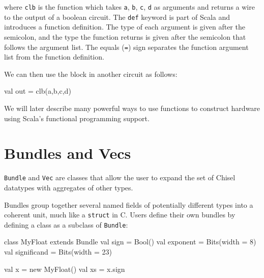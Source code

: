 \documentclass[twocolumn,10pt]{article}
\def\code#1{{\tt #1}}
\begin{document}
\noindent
where \code{clb} is the function which takes \code{a}, \code{b},
\code{c}, \code{d} as arguments and returns a wire to the output of a
boolean circuit.  The \code{def} keyword is part of Scala and
introduces a function definition.  The type of each argument is given
after the semicolon, and the type the function returns is given after
the semicolon that follows the argument list.  The equals (\code{=})
sign separates the function argument list from the function
definition.

We can then use the block in another circuit as follows:
\begin{scala}
val out = clb(a,b,c,d)
\end{scala}






We will later describe many powerful ways to use functions to
construct hardware using Scala's functional programming support.

\section{Bundles and Vecs}

\code{Bundle} and \code{Vec} are classes that allow the user to expand
the set of Chisel datatypes with aggregates of other types.

Bundles group together several named fields of potentially different
types into a coherent unit, much like a \code{struct} in C. Users
define their own bundles by defining a class as a subclass of
\code{Bundle}:
\begin{scala}
class MyFloat extends Bundle {
  val sign        = Bool()
  val exponent    = Bits(width = 8)
  val significand = Bits(width = 23)
}

val x  = new MyFloat()
val xs = x.sign
\end{scala}
\end{document}
